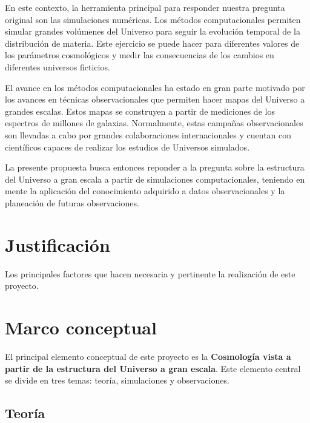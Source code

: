 \documentclass[12pt]{article}
\begin{document}
En este contexto, la herramienta principal para responder nuestra
pregunta original son las simulaciones num\'ericas. Los 
m\'etodos computacionales permiten simular grandes
vol\'umenes del Universo para seguir la evoluci\'on temporal de la
distribuci\'on de materia. Este ejercicio se puede hacer para
diferentes valores de los par\'ametros cosmol\'ogicos y 
medir las consecuencias de los cambios en diferentes universos
ficticios.  

El avance en los m\'etodos computacionales ha estado en gran parte
motivado por los avances en t\'ecnicas observacionales que permiten
hacer mapas del Universo a grandes escalas. Estos mapas se construyen
a partir de mediciones de los espectros de millones de
galaxias. Normalmente, estas campa\~nas observacionales son llevadas a
cabo por grandes colaboraciones internacionales y cuentan  con
cient\'ificos capaces de realizar los estudios de Universos simulados.

La presente propuesta busca entonces reponder a la pregunta sobre la
estructura del Universo a gran escala a partir de simulaciones
computacionales, teniendo en mente la aplicaci\'on del conocimiento
adquirido a datos observacionales y la planeaci\'on de futuras
observaciones.

\section{Justificaci\'on}

Los principales factores que hacen necesaria y pertinente la
realizaci\'on de este proyecto.

\section{Marco conceptual}


El principal elemento conceptual de este proyecto es la {\bf Cosmolog\'ia
vista a partir de la estructura del Universo a gran escala}. Este
elemento central se divide en tres temas: teor\'ia,
simulaciones y observaciones.

\subsection{Teor\'ia}
\end{document}
